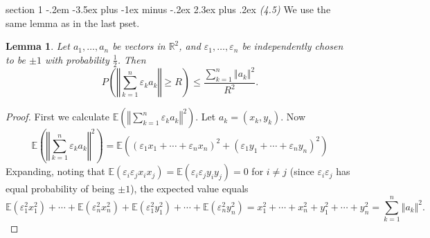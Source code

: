 \documentclass[12pt]{article}
\makeatletter
\theoremstyle{norm}
\newtheorem{lem}[thm]{Lemma}
\newcommand{\E}[0]{\mathbb{E}}
\newcommand{\R}[0]{\mathbb{R}}
\newcommand{\rc}[1]{\frac{1}{#1}}
\newcommand{\ep}[0]{\varepsilon}
\newcommand{\pa}[1]{\left( {#1} \right)}
\newenvironment{problem}{\@startsection
       {section}
       {1}
       {-.2em}
       {-3.5ex plus -1ex minus -.2ex}
       {2.3ex plus .2ex}
       {\pagebreak[3]%
       \large\bf\noindent{Problem }
       }
       }
       {%
       }
\makeatother
\begin{document}
\begin{problem}{\it (4.5)}
We use the same lemma as in the last pset.
\begin{lem}\label{p4-2-l1}
Let $a_1,\ldots, a_n$ be vectors in $\R^2$, and $\ep_1,\ldots, \ep_n$ be independently chosen to be $\pm 1$ with probability $\rc2$. Then
\[
P\pa{\left\Vert\sum_{k=1}^n \ep_ka_k\right\Vert\ge R}\le\frac{\sum_{k=1}^n \Vert a_k\Vert^2}{R^2}. 
\]
\end{lem}
\begin{proof}
First we calculate $\E\pa{\left\Vert\sum_{k=1}^n \ep_ka_k\right\Vert^2}$. Let $a_k=(x_k,y_k)$. Now
\[
\E\pa{\left\Vert\sum_{k=1}^n \ep_ka_k\right\Vert^2} =\E((\ep_1x_1+\cdots +\ep_nx_n)^2+(\ep_1y_1+\cdots +\ep_ny_n)^2)\]
Expanding, noting that $\E(\ep_i\ep_jx_ix_j)=\E(\ep_i\ep_jy_iy_j)=0$ for $i\ne j$ (since $\ep_i\ep_j$ has equal probability of being $\pm1$), the expected value equals
\[
\E(\ep_1^2x_1^2)+\cdots +\E(\ep_n^2 x_n^2)+\E(\ep_1^2 y_1^2)+\cdots +\E(\ep_n^2y_n^2)=x_1^2+\cdots +x_n^2+y_1^2+\cdots +y_n^2=\sum_{k=1}^n \Vert a_k\Vert^2.
\]


\end{proof}
\end{problem}
\end{document}
